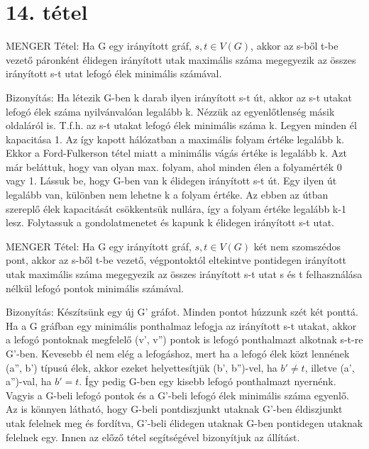 \section{14. tétel}

\begin{framed}
MENGER Tétel: Ha G egy irányított gráf, $s,t\in V(G)$, akkor az s-ből t-be vezető páronként élidegen irányított utak maximális száma megegyezik az összes irányított s-t utat lefogó élek minimális számával.
\end{framed}
\begin{leftbar}
Bizonyítás: Ha létezik G-ben k darab ilyen irányított s-t út, akkor az s-t utakat lefogó élek száma nyilvánvalóan legalább k. Nézzük az egyenlőtlenség másik oldaláról is. T.f.h. az s-t utakat lefogó élek minimális száma k. Legyen minden él kapacitása 1. Az így kapott hálózatban a maximális folyam értéke legalább k. Ekkor a Ford-Fulkerson tétel miatt a minimális vágás értéke is legalább k. Azt már beláttuk, hogy van olyan max. folyam, ahol minden élen a folyamérték 0 vagy 1. Lássuk be, hogy G-ben van k élidegen irányított s-t út. Egy ilyen út legalább van, különben nem lehetne k a folyam értéke. Az ebben az útban szereplő élek kapacitását csökkentsük nullára, így a folyam értéke legalább k-1 lesz. Folytassuk a gondolatmenetet és kapunk k élidegen irányított s-t utat.
\end{leftbar}
\begin{framed}
MENGER Tétel: Ha G egy irányított gráf, $s,t\in V(G)$ két nem szomszédos pont, akkor az s-ből t-be vezető, végpontoktól eltekintve pontidegen irányított utak maximális száma megegyezik az összes irányított s-t utat s és t felhasználása nélkül lefogó pontok minimális számával.
\end{framed}
\begin{leftbar}
Bizonyítás: Készítsünk egy új G' gráfot. Minden pontot húzzunk szét két ponttá. Ha a G gráfban egy minimális ponthalmaz lefogja az irányított s-t utakat, akkor a lefogó pontoknak megfelelő (v', v'') pontok is lefogó ponthalmazt alkotnak s-t-re G'-ben. Kevesebb él nem elég a lefogáshoz, mert ha a lefogó élek közt lennének (a'', b') típusú élek, akkor ezeket helyettesítjük (b', b'')-vel, ha $b' \neq t$, illetve (a', a'')-val, ha $b' = t$. Így pedig G-ben egy kisebb lefogó ponthalmazt nyernénk. Vagyis a G-beli lefogó pontok és a G'-beli lefogó élek minimális száma egyenlő. Az is könnyen látható, hogy G-beli pontdiszjunkt utaknak G'-ben éldiszjunkt utak felelnek meg és fordítva, G'-beli élidegen utaknak G-ben pontidegen utaknak felelnek egy. Innen az előző tétel segítségével bizonyítjuk az állítást.
\end{leftbar}
